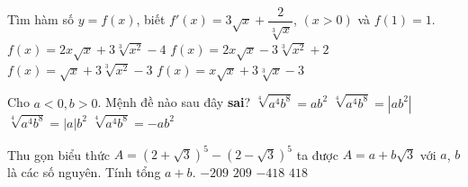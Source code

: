 \begin{ex}%
	Tìm hàm số $y=f(x)$, biết $f'(x)=3\sqrt{x}+\dfrac{2}{\sqrt[3]x}$,  $(x > 0)$ và $f(1)=1$.
	 \choice
		 {\True $f(x)=2x \sqrt{x}+3\sqrt[3]{x^2}-4$}
		{$f(x)=2x \sqrt{x}-3\sqrt[3]{x^2}+2$} 
		 {$f(x)=\sqrt{x}+3\sqrt[3]{x^2}-3$}
		{$f(x)=x \sqrt{x}+3\sqrt[3]x-3$} 
\end{ex}

\begin{ex}%
	 Cho $a < 0, b > 0$. Mệnh đề nào sau đây \textbf{sai}?
	 \choice
		{$\sqrt[4]{a^4 b^8}=a b^2$} 
		{$\sqrt[4]{a^4 b^8}=\left|a b^2\right|$} 
		{$\sqrt[4]{a^4 b^8}=|a|b^2$} 
		{\True $\sqrt[4]{a^4  b^8}=-a b^2$}
\end{ex}

\begin{ex}%
	Thu  gọn biểu thức $A=\left(2+\sqrt{3}\right)^5-\left(2-\sqrt{3}\right)^5$ ta được $A=a+b \sqrt{3}$ với $a$, $b$ là các số nguyên. Tính tổng $a+b$.
	\choice 
		 {$-209$}
		 {$209$}
		{$-418$} 
		{\True $418$} 
\end{ex}
